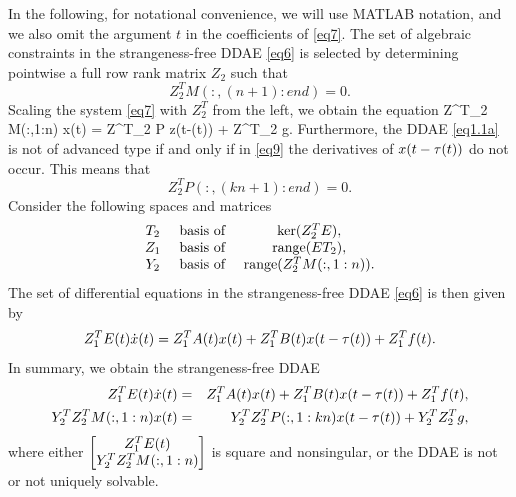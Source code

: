 \documentclass[final,reqno]{siamltex}
\begin{document}
In the following, for notational convenience, we will use MATLAB notation, \cite{matlab} and we also omit the
argument $t$ in the coefficients of \eqref{eq7}.
The set of algebraic constraints in the strangeness-free DDAE \eqref{eq6} is selected by determining pointwise a full row rank matrix $Z_2$ such that
%
\[ %
 Z^T_2 M(:,(n+1):end) = 0.
\]%
%
Scaling the system \eqref{eq7} with $Z^T_2$ from the left, we obtain the equation
%
\be\label{eq9}
 Z^T_2 M(:,1:n) x(t) = Z^T_2 P z(t-\vtau(t)) + Z^T_2 g.
\ee
%
Furthermore, the DDAE \eqref{eq1.1a} is not of advanced type if and only if in \eqref{eq9} the derivatives of $x(t-{\tau}(t))$ do not occur. This means
that
%
\[ %
 Z^T_2 P(:,(kn+1):end) = 0.
\] %
%
Consider the following spaces and matrices
%
\[ %
\begin{array}{ccc}
 T_2 & \mbox{ basis of } & \ker(Z^T_2 E), \\
 Z_1 & \mbox{ basis of } & \range(E T_2), \\
 Y_2 & \mbox{ basis of } & \range(Z^T_2 M(:,1:n)). \\
\end{array}
\] %
%
The set of differential equations in the strangeness-free DDAE \eqref{eq6} is then given by
%
\[
 Z_1^T E(t)\dot{x}(t) = Z_1^T A(t)x(t) + Z_1^T B(t) x(t-{\tau}(t)) + Z_1^T f(t).
\]
%
In summary, we obtain the strangeness-free DDAE
%
\begin{eqnarray*} %
  Z_1^T E(t)\dot{x}(t) &= & Z_1^T A(t)x(t) +  Z_1^T B(t) x(t-\vtau(t)) +  Z_1^T f(t), \\
 Y^T_2 Z^T_2 M(:,1:n) x(t)  &=& Y^T_2 Z^T_2 P(:,1:kn) x(t-\vtau(t)) + Y^T_2 Z^T_2 g,
\end{eqnarray*}
%
where either $\begin{bmatrix} Z_1^T E(t) \\ Y^T_2 Z^T_2 M(:,1:n) \end{bmatrix}$ is square and nonsingular, or the DDAE is not or not uniquely solvable.
\end{document}
